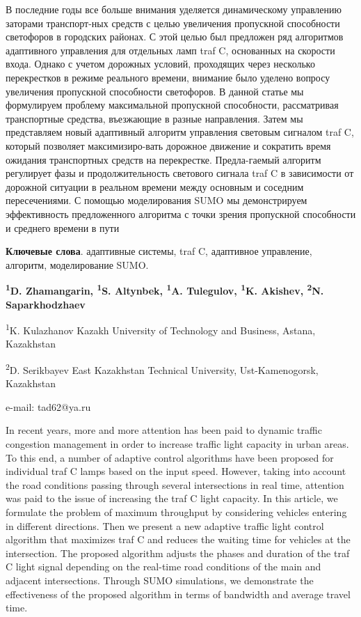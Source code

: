 В последние годы все больше внимания уделяется динамическому управлению
заторами транспорт-ных средств с целью увеличения пропускной способности
светофоров в городских районах. С этой целью был предложен ряд
алгоритмов адаптивного управления для отдельных ламп traf C, основанных
на скорости входа. Однако с учетом дорожных условий, проходящих через
несколько перекрестков в режиме реального времени, внимание было уделено
вопросу увеличения пропускной способности светофоров. В данной статье мы
формулируем проблему максимальной пропускной способности, рассматривая
транспортные средства, въезжающие в разные направления. Затем мы
представляем новый адаптивный алгоритм управления световым сигналом traf
C, который позволяет максимизиро-вать дорожное движение и сократить время
ожидания транспортных средств на перекрестке. Предла-гаемый алгоритм
регулирует фазы и продолжительность светового сигнала traf C в
зависимости от дорожной ситуации в реальном времени между основным и
соседним пересечениями. С помощью моделирования SUMO мы демонстрируем
эффективность предложенного алгоритма с точки зрения пропускной
способности и среднего времени в пути

{\bfseries Ключевые слова}. адаптивные системы, traf C, адаптивное
управление, алгоритм, моделирование SUMO.


\begin{center}
{\bfseries \textsuperscript{1}D. Zhamangarin, \textsuperscript{1}S. Altynbek, 
\textsuperscript{1}A. Tulegulov\envelope , \textsuperscript{1}K. Akishev, \textsuperscript{2}N. Saparkhodzhaev}

\textsuperscript{1}K. Kulazhanov Kazakh University of Technology and
Business, Astana, Kazakhstan

\textsuperscript{2}D. Serikbayev East Kazakhstan Technical University,
Ust-Kamenogorsk, Kazakhstan

e-mail: tad62@ya.ru
\end{center}

In recent years, more and more attention has been paid to dynamic
traffic congestion management in order to increase traffic light
capacity in urban areas. To this end, a number of adaptive control
algorithms have been proposed for individual traf C lamps based on the
input speed. However, taking into account the road conditions passing
through several intersections in real time, attention was paid to the
issue of increasing the traf C light capacity. In this article, we
formulate the problem of maximum throughput by considering vehicles
entering in different directions. Then we present a new adaptive traffic
light control algorithm that maximizes traf C and reduces the waiting
time for vehicles at the intersection. The proposed algorithm adjusts
the phases and duration of the traf C light signal depending on the
real-time road conditions of the main and adjacent intersections.
Through SUMO simulations, we demonstrate the effectiveness of the
proposed algorithm in terms of bandwidth and average travel time.

